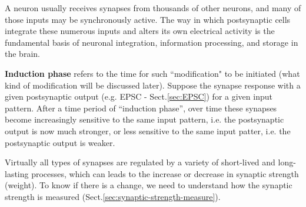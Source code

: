 A neuron usually receives synapses from thousands of other neurons, and many of
those inputs may be synchronously active.
The way in which postsynaptic cells integrate these numerous inputs and alters
its own electrical activity is the fundamental basis of neuronal integration,
information processing, and storage in the brain.

{\bf Induction phase} refers to the time for such ``modification" to be
initiated (what kind of modification will be discussed later).
Suppose the synapse response with a given postsynaptic output (e.g. EPSC -
Sect.\ref{sec:EPSC}) for a given input pattern. After a time period of
``induction phase'', over time these synapses become increasingly sensitive to
the same input pattern, i.e. the postsynaptic output is now much stronger, or
less sensitive to the same input patter, i.e. the postsynaptic output is
weaker.
 
Virtually all types of synapses are regulated by a variety of short-lived and
long-lasting processes, which can leads to the increase or decrease in synaptic
strength (weight). To know if there is a change, we need to understand how the
synaptic strength is measured (Sect.\ref{sec:synaptic-strength-measure}).
  

